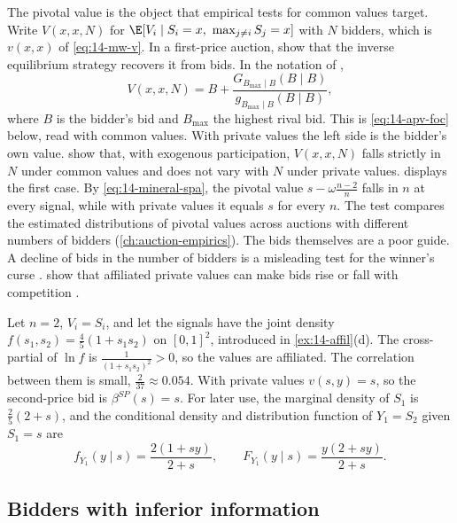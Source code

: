 The pivotal value is the object that empirical tests for common values target. Write $V(x,x,N)$ for
$\E[V_i\mid S_i=x,\ \max_{j\ne i}S_j=x]$ with $N$ bidders, which is $v(x,x)$ of \eqref{eq:14-mw-v}. In a
first-price auction, \citet{LaffontVuong1996} show that the inverse equilibrium strategy recovers it from bids.
In the notation of \citet[Section~2.3, p.~93]{HortacsuPerrigne2021},
\begin{equation*}
  V(x,x,N)=B+\frac{G_{B_{\max}\mid B}(B\mid B)}{g_{B_{\max}\mid B}(B\mid B)},
\end{equation*}
where $B$ is the bidder's bid and $B_{\max}$ the highest rival bid. This is \eqref{eq:14-apv-foc} below, read
with common values. With private values the left side is the bidder's own value. 
show that, with exogenous participation, $V(x,x,N)$ falls strictly in $N$ under common values and does not vary
with $N$ under private values.  displays the first case. By \eqref{eq:14-mineral-spa}, the
pivotal value $s-\omega\frac{n-2}{n}$ falls in $n$ at every signal, while with private values it equals $s$
for every $n$. The test compares the estimated distributions of pivotal values across auctions with different
numbers of bidders (\cref{ch:auction-empirics}). The bids themselves are a poor guide. A decline of bids in the
number of bidders is a misleading test for the winner's curse \citep{Laffont1997}.  show
that affiliated private values can make bids rise or fall with competition \citep[footnote~10,
p.~93]{HortacsuPerrigne2021}.

\begin{example}\label{ex:14-apv}
Let $n=2$, $V_i=S_i$, and let the signals have the joint density $f(s_1,s_2)=\frac{4}{5}(1+s_1s_2)$ on
$[0,1]^2$, introduced in \cref{ex:14-affil}(d). The cross-partial of $\ln f$ is $\frac{1}{(1+s_1s_2)^2}>0$, so
the values are affiliated. The correlation between them is small, $\frac{2}{37}\approx0.054$. With private
values $v(s,y)=s$, so the second-price bid is $\beta^{SP}(s)=s$. For later use, the marginal density of $S_1$
is $\frac{2}{5}(2+s)$, and the conditional density and distribution function of $Y_1=S_2$ given $S_1=s$ are
\begin{equation}\label{eq:14-apv-cond}
  f_{Y_1}(y\mid s)=\frac{2(1+sy)}{2+s},\qquad F_{Y_1}(y\mid s)=\frac{y(2+sy)}{2+s}.
\end{equation}
\end{example}

\subsection{Bidders with inferior information}\label{sec:14-mw-inferior}

